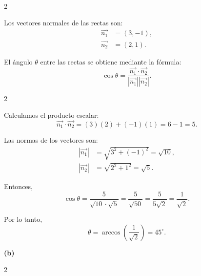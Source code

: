 \documentclass[11pt]{article}
\begin{document}
\begin{enumerate}[\hspace{-5mm} 1) ]
\begin{multicols}{2}
\begin{center}
\begin{tikzpicture}[scale=0.5]
\end{tikzpicture}

\end{center}



Los vectores normales de las rectas son:
\begin{align*}
    \vec{n_1} &= (3, -1), \\
    \vec{n_2} &= (2, 1).
\end{align*}


El ángulo $ \theta $ entre las rectas se obtiene mediante la fórmula:
\begin{equation*}
    \cos \theta = \frac{\vec{n_1} \cdot \vec{n_2}}{|\vec{n_1}| |\vec{n_2}|}.
\end{equation*}

\end{multicols}



\begin{multicols}{2}

Calculamos el producto escalar:
\begin{equation*}
    \vec{n_1} \cdot \vec{n_2} = (3)(2) + (-1)(1) = 6 - 1 = 5.
\end{equation*}

Las normas de los vectores son:
\begin{align*}
    |\vec{n_1}| &= \sqrt{3^2 + (-1)^2} = \sqrt{10}, \\
    |\vec{n_2}| &= \sqrt{2^2 + 1^2} = \sqrt{5}.
\end{align*}

Entonces,
\begin{equation*}
    \cos \theta = \frac{5}{\sqrt{10} \cdot \sqrt{5}} = \frac{5}{\sqrt{50}} = \frac{5}{5\sqrt{2}} = \frac{1}{\sqrt{2}}.
\end{equation*}

Por lo tanto,
\begin{equation*}
    \theta = \arccos \left( \frac{1}{\sqrt{2}} \right) = 45^\circ.
\end{equation*}

\end{multicols}








\textbf{ (b)}

\begin{multicols}{2}
\begin{center}
    

\end{center}
\end{multicols}
\end{enumerate}
\end{document}

